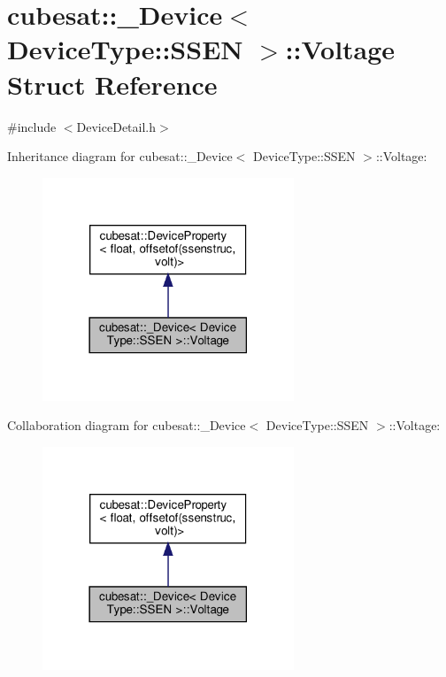 \hypertarget{structcubesat_1_1__Device_3_01DeviceType_1_1SSEN_01_4_1_1Voltage}{}\section{cubesat\+:\+:\+\_\+\+Device$<$ Device\+Type\+:\+:S\+S\+EN $>$\+:\+:Voltage Struct Reference}
\label{structcubesat_1_1__Device_3_01DeviceType_1_1SSEN_01_4_1_1Voltage}


{\ttfamily \#include $<$Device\+Detail.\+h$>$}



Inheritance diagram for cubesat\+:\+:\+\_\+\+Device$<$ Device\+Type\+:\+:S\+S\+EN $>$\+:\+:Voltage\+:\nopagebreak
\begin{figure}[H]
\begin{center}
\leavevmode
\includegraphics[width=213pt]{structcubesat_1_1__Device_3_01DeviceType_1_1SSEN_01_4_1_1Voltage__inherit__graph}
\end{center}
\end{figure}


Collaboration diagram for cubesat\+:\+:\+\_\+\+Device$<$ Device\+Type\+:\+:S\+S\+EN $>$\+:\+:Voltage\+:\nopagebreak
\begin{figure}[H]
\begin{center}
\leavevmode
\includegraphics[width=213pt]{structcubesat_1_1__Device_3_01DeviceType_1_1SSEN_01_4_1_1Voltage__coll__graph}
\end{center}
\end{figure}
